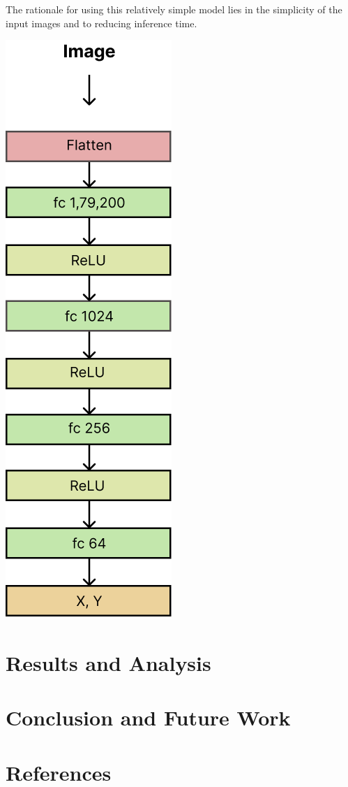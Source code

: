 \documentclass[a4paper]{article}
\begin{document}
\begin{multicols}{2}
\par \noindent
The rationale for using this relatively simple model lies in the simplicity of the input images 
and to reducing inference time.

{ \centering
 \includegraphics[width=0.2\columnwidth]{../results/model.png}\\
 \label{pinki}
}



\section{Results and Analysis}
\section{Conclusion and Future Work}

\section{References}

\end{multicols}
\end{document}

